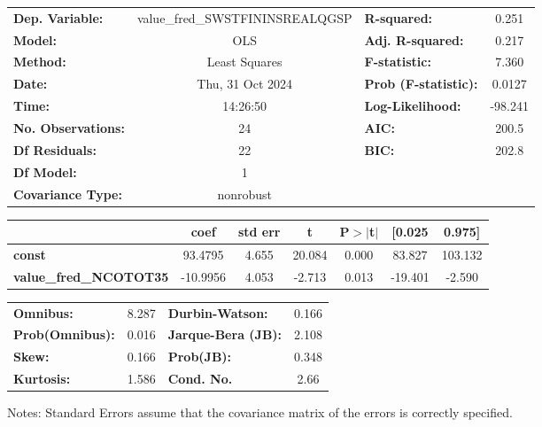 \begin{center}
\begin{tabular}{lclc}
\toprule
\textbf{Dep. Variable:}        & value\_fred\_SWSTFININSREALQGSP & \textbf{  R-squared:         } &     0.251   \\
\textbf{Model:}                &               OLS               & \textbf{  Adj. R-squared:    } &     0.217   \\
\textbf{Method:}               &          Least Squares          & \textbf{  F-statistic:       } &     7.360   \\
\textbf{Date:}                 &         Thu, 31 Oct 2024        & \textbf{  Prob (F-statistic):} &   0.0127    \\
\textbf{Time:}                 &             14:26:50            & \textbf{  Log-Likelihood:    } &   -98.241   \\
\textbf{No. Observations:}     &                  24             & \textbf{  AIC:               } &     200.5   \\
\textbf{Df Residuals:}         &                  22             & \textbf{  BIC:               } &     202.8   \\
\textbf{Df Model:}             &                   1             & \textbf{                     } &             \\
\textbf{Covariance Type:}      &            nonrobust            & \textbf{                     } &             \\
\bottomrule
\end{tabular}
\begin{tabular}{lcccccc}
                               & \textbf{coef} & \textbf{std err} & \textbf{t} & \textbf{P$> |$t$|$} & \textbf{[0.025} & \textbf{0.975]}  \\
\midrule
\textbf{const}                 &      93.4795  &        4.655     &    20.084  &         0.000        &       83.827    &      103.132     \\
\textbf{value\_fred\_NCOTOT35} &     -10.9956  &        4.053     &    -2.713  &         0.013        &      -19.401    &       -2.590     \\
\bottomrule
\end{tabular}
\begin{tabular}{lclc}
\textbf{Omnibus:}       &  8.287 & \textbf{  Durbin-Watson:     } &    0.166  \\
\textbf{Prob(Omnibus):} &  0.016 & \textbf{  Jarque-Bera (JB):  } &    2.108  \\
\textbf{Skew:}          &  0.166 & \textbf{  Prob(JB):          } &    0.348  \\
\textbf{Kurtosis:}      &  1.586 & \textbf{  Cond. No.          } &     2.66  \\
\bottomrule
\end{tabular}
\end{center}

Notes: \newline
 [1] Standard Errors assume that the covariance matrix of the errors is correctly specified.